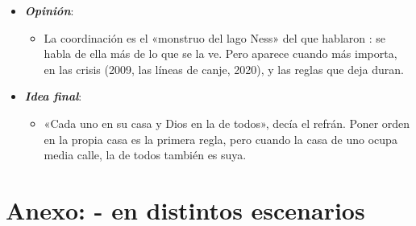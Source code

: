 \documentclass[11pt]{article}
\begin{document}
\begin{itemize}
\begin{itemize}
  \item los clubes climáticos  y la fiscalidad internacional con los 2~pilares ;
  \item la deuda de los países de renta baja y el Marco Común , y los derechos especiales de giro del FMI .
  \end{itemize}
\item \textbf{\emph{Opinión}}:
  \begin{itemize}
  \item La coordinación es el «monstruo del lago Ness» del que hablaron \textcite{BlanchardOstryGhosh2013}: se habla de ella más de lo que se la ve. Pero aparece cuando más importa, en las crisis (2009, las líneas de canje, 2020), y las reglas que deja duran.
  \end{itemize}
\item \textbf{\emph{Idea final}}:
  \begin{itemize}
  \item «Cada uno en su casa y Dios en la de todos», decía el refrán. Poner orden en la propia casa es la primera regla, pero cuando la casa de uno ocupa media calle, la de todos también es suya.
  \end{itemize}
\end{itemize}

\clearpage
\appendix

\section{Anexo: - en distintos escenarios}\label{anexo:mundell-fleming}
\end{document}
